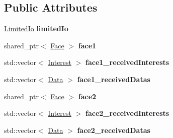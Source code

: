 \subsection*{Public Attributes}
\begin{DoxyCompactItemize}
\item 
\hyperlink{classnfd_1_1tests_1_1LimitedIo}{Limited\+Io} {\bfseries limited\+Io}\hypertarget{classnfd_1_1tests_1_1EndToEndFixture_ac453aa3f8095608135b25328d1ba50b3}{}\label{classnfd_1_1tests_1_1EndToEndFixture_ac453aa3f8095608135b25328d1ba50b3}

\item 
shared\+\_\+ptr$<$ \hyperlink{classnfd_1_1Face}{Face} $>$ {\bfseries face1}\hypertarget{classnfd_1_1tests_1_1EndToEndFixture_a12125ce124422fa899e7caf10177a072}{}\label{classnfd_1_1tests_1_1EndToEndFixture_a12125ce124422fa899e7caf10177a072}

\item 
std\+::vector$<$ \hyperlink{classndn_1_1Interest}{Interest} $>$ {\bfseries face1\+\_\+received\+Interests}\hypertarget{classnfd_1_1tests_1_1EndToEndFixture_a31b4c776140515c318db7f9c48e4a46c}{}\label{classnfd_1_1tests_1_1EndToEndFixture_a31b4c776140515c318db7f9c48e4a46c}

\item 
std\+::vector$<$ \hyperlink{classndn_1_1Data}{Data} $>$ {\bfseries face1\+\_\+received\+Datas}\hypertarget{classnfd_1_1tests_1_1EndToEndFixture_aa064cb32c27da6ff39e4f856c05ef558}{}\label{classnfd_1_1tests_1_1EndToEndFixture_aa064cb32c27da6ff39e4f856c05ef558}

\item 
shared\+\_\+ptr$<$ \hyperlink{classnfd_1_1Face}{Face} $>$ {\bfseries face2}\hypertarget{classnfd_1_1tests_1_1EndToEndFixture_a8158ab0d3cc29236f356a45f6e54909c}{}\label{classnfd_1_1tests_1_1EndToEndFixture_a8158ab0d3cc29236f356a45f6e54909c}

\item 
std\+::vector$<$ \hyperlink{classndn_1_1Interest}{Interest} $>$ {\bfseries face2\+\_\+received\+Interests}\hypertarget{classnfd_1_1tests_1_1EndToEndFixture_aa7617ac8955d0a004380ab97c01c612f}{}\label{classnfd_1_1tests_1_1EndToEndFixture_aa7617ac8955d0a004380ab97c01c612f}

\item 
std\+::vector$<$ \hyperlink{classndn_1_1Data}{Data} $>$ {\bfseries face2\+\_\+received\+Datas}\hypertarget{classnfd_1_1tests_1_1EndToEndFixture_aeac9f103089b8c9e3031cb2361151b6a}{}\label{classnfd_1_1tests_1_1EndToEndFixture_aeac9f103089b8c9e3031cb2361151b6a}


\end{DoxyCompactItemize}
